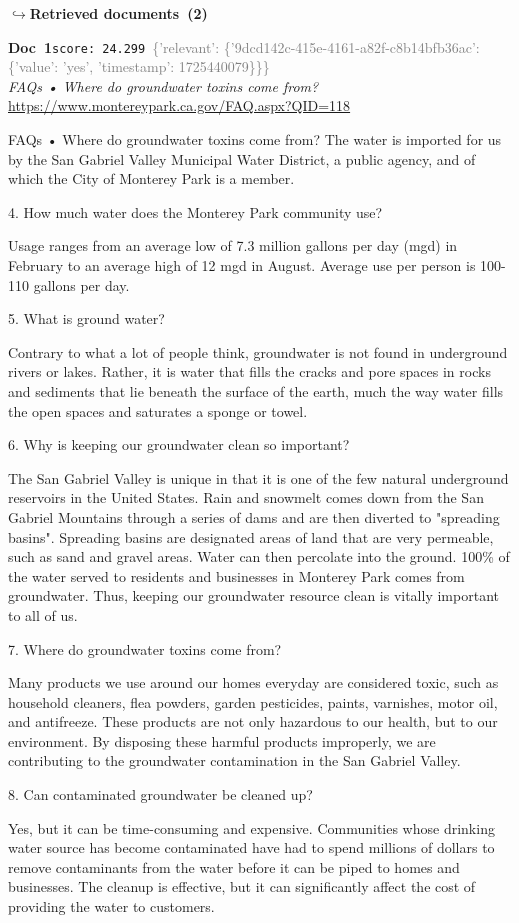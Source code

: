 \documentclass[a4paper,11pt]{article}
\begin{document}
\noindent\hfill{\footnotesize\textcolor{doccolor}{\textbf{$\hookrightarrow$\enspace Retrieved documents~(2)}}}
\begin{docenv}
{\footnotesize\textcolor{doccolor}{\textbf{Doc~1}}}\hfill{\tiny\texttt{score:~24.299}}\ {\tiny\textcolor{gray}{\{'relevant': \{'9dcd142c-415e-4161-a82f-c8b14bfb36ac': \{'value': 'yes', 'timestamp': 1725440079\}\}\}}}\\[3pt]
{\small\textit{FAQs • Where do groundwater toxins come from?}}\\[2pt]
{\tiny\url{https://www.montereypark.ca.gov/FAQ.aspx?QID=118}}\\[4pt]
{\footnotesize FAQs • Where do groundwater toxins come from?
The water is imported for us by the San Gabriel Valley Municipal Water District, a public agency, and of which the City of Monterey Park is a member.	

4.
How much water does the Monterey Park community use?

Usage ranges from an average low of 7.3 million gallons per day (mgd) in February to an average high of 12 mgd in August. Average use per person is 100-110 gallons per day.	

5.
What is ground water?

Contrary to what a lot of people think, groundwater is not found in underground rivers or lakes. Rather, it is water that fills the cracks and pore spaces in rocks and sediments that lie beneath the surface of the earth, much the way water fills the open spaces and saturates a sponge or towel. 	

6.
Why is keeping our groundwater clean so important?

The San Gabriel Valley is unique in that it is one of the few natural underground reservoirs in the United States. Rain and snowmelt comes down from the San Gabriel Mountains through a series of dams and are then diverted to "spreading basins". Spreading basins are designated areas of land that are very permeable, such as sand and gravel areas. Water can then percolate into the ground. 100\% of the water served to residents and businesses in Monterey Park comes from groundwater. Thus, keeping our groundwater resource clean is vitally important to all of us. 	

7.
Where do groundwater toxins come from?

Many products we use around our homes everyday are considered toxic, such as household cleaners, flea powders, garden pesticides, paints, varnishes, motor oil, and antifreeze. These products are not only hazardous to our health, but to our environment. By disposing these harmful products improperly, we are contributing to the groundwater contamination in the San Gabriel Valley.	

8.
Can contaminated groundwater be cleaned up?

Yes, but it can be time-consuming and expensive. Communities whose drinking water source has become contaminated have had to spend millions of dollars to remove contaminants from the water before it can be piped to homes and businesses. The cleanup is effective, but it can significantly affect the cost of providing the water to customers.}
\end{docenv}
\end{document}
